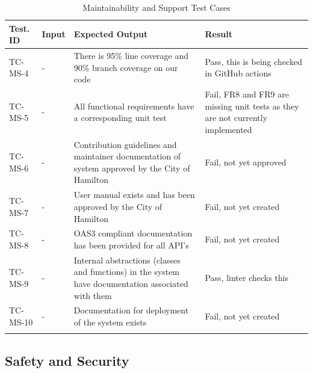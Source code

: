 \documentclass[12pt, titlepage]{article}
\begin{document}
\begin{longtable}{|m{2cm}|m{1cm}|m{6cm}|m{3cm}|}
  \hline
  \textbf{Test. ID} & \textbf{Input} & \textbf{Expected Output} &
  \textbf{Result} \\
  \hline
  TC-MS-4 & - & There is 95\% line coverage and 90\% branch coverage
  on our code & Pass, this is being checked in GitHub actions\\ \hline
  TC-MS-5 & - & All functional requirements have a corresponding unit
  test & Fail, FR8 and FR9 are missing unit tests as they are not
  currently implemented\\ \hline
  TC-MS-6 & - & Contribution guidelines and maintainer documentation
  of system approved by the City of Hamilton & Fail, not yet approved\\ \hline
  TC-MS-7 & - & User manual exists and has been approved by the City
  of Hamilton & Fail, not yet created\\ \hline
  TC-MS-8 & - & OAS3 compliant documentation has been provided for
  all API's & Fail, not yet created\\ \hline
  TC-MS-9 & - & Internal abstractions (classes and functions) in the
  system have documentation associated with them & Pass, linter
  checks this\\ \hline
  TC-MS-10 & - & Documentation for deployment of the system exists &
  Fail, not yet created\\ \hline
  \caption{Maintainability and Support Test Cases}
\end{longtable}

\subsection{Safety and Security}
\end{document}

